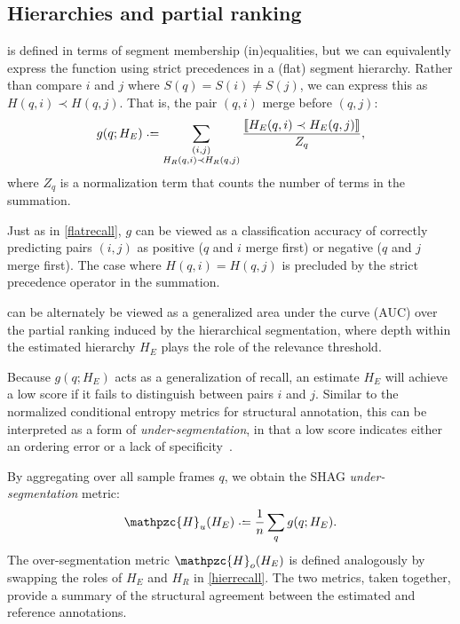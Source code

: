 \documentclass{article}
\def\shag{\ensuremath{\mathpzc{H}}}
\begin{document}
\subsection{Hierarchies and partial ranking}

 is defined in terms of segment membership (in)equalities, but 
we can equivalently express the function using strict precedences in a (flat)
segment hierarchy.
Rather than compare $i$ and $j$ where $S(q) = S(i) \neq S(j)$, we can express this as $H(q, i) \prec H(q, j)$.
That is, the pair $(q,i)$ merge before $(q,j)$:
\begin{equation}
g(q ; H_E) \defeq \sum_{\substack{(i, j)\\ H_R(q, i) \prec H_R(q, j)}}
\frac{\ind{H_E(q, i) \prec H_E(q, j)}}{Z_q},\label{hierrecall}
\end{equation}
where $Z_q$ is a normalization term that counts the number of terms in the summation.

Just as in \cref{flatrecall}, $g$ can be viewed as a classification accuracy of
correctly predicting pairs $(i, j)$ as positive ($q$ and $i$ merge first) or negative
($q$ and $j$ merge first).  The case where $H(q, i) = H(q, j)$ is precluded by the
strict precedence operator in the summation.

 can be alternately be viewed as a generalized area under the curve
(AUC) over the partial ranking induced by the hierarchical segmentation, where depth 
within the estimated hierarchy $H_E$ plays the role of the relevance threshold.

Because $g(q; H_E)$ acts as a generalization of recall, an estimate $H_E$ will achieve 
a low score if it fails to distinguish between pairs $i$ and $j$.  Similar to the 
normalized conditional entropy metrics for structural annotation, this can be interpreted 
as a form of \emph{under-segmentation}, in that a low score indicates either an ordering 
error or a lack of specificity~\cite{Lukashevich2008}.  

By aggregating over all sample frames $q$, we obtain the SHAG \emph{under-segmentation} metric:
\begin{equation}
\shag_u(H_E) \defeq \frac{1}{n} \sum_q g(q ; H_E).\label{shagunder}
\end{equation}
The over-segmentation metric $\shag_o(H_E)$ is defined analogously by swapping the roles of $H_E$ and $H_R$ in \cref{hierrecall}.
The two metrics, taken together, provide a summary of the structural agreement between the estimated and reference annotations.
\end{document}
